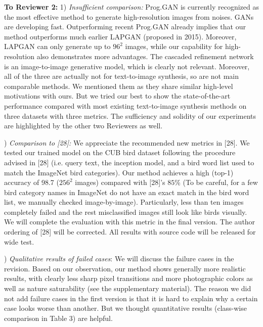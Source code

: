 \documentclass[10pt,twocolumn,letterpaper]{article}
\begin{document}
\noindent
\textbf{To Reviewer 2:} 1) \textit{Insufficient comparison: } Prog.GAN is currently recognized as the most effective method to generate high-resolution images from noises. GANs are developing fast. Outperforming recent Prog.GAN already implies that our method outperforms much earlier LAPGAN (proposed in 2015). Moreover, LAPGAN can only generate up to $96^2$ images, while our capability for high-resolution also demonstrates more advantages. The cascaded refinement network is an image-to-image generative model, which is clearly not relevant. Moreover, all of the three are actually not for text-to-image synthesis, so are not main comparable methods. We mentioned them as they share similar high-level motivations with ours. But we tried our best to show the state-of-the-art performance compared with most existing text-to-image synthesis methods on three datasets with three metrics. The sufficiency and solidity of our experiments are highlighted by the other two Reviewers as well. 


) \textit{Comparison to [28]: } We appreciate the recommended new metrics in [28]. We tested our trained model on the CUB bird dataset following the procedure advised in [28] (i.e. query text, the inception model, and a bird word list used to match the ImageNet bird categories). Our method achieves a high (top-1) accuracy of 98.7 ($256^2$ images) compared with [28]'s $85\%$ (To be careful, for a few bird category names in ImageNet do not have an exact match in the bird word list, we manually checked image-by-image). Particularly, less than ten images completely failed and the rest misclassified images still look like birds visually. We will complete the evaluation with this metric in the final version. The author ordering of [28] will be corrected. All results with source code will be released for wide test. %

) \textit{Qualitative results of failed cases}: We will discuss the failure cases in the revision. Based on our observation, our method shows generally more realistic results, with clearly less sharp pixel transitions and more photographic colors as well as nature saturability (see the supplementary material). The reason we did not add failure cases in the first version is that it is hard to explain why a certain case looks worse than another. But we thought quantitative results (class-wise comparison in Table 3) are helpful.
\end{document}
